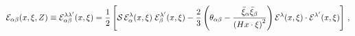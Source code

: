 \begin{equation}
{\cal E}_{\alpha\beta}(x,\xi,Z)\equiv {\cal
E}_{\alpha\beta}^{\lambda\lambda'}(x,\xi)=\frac{1}{2}
 \left[ {\cal S}\,{\cal
E}_{\alpha}^{\lambda}(x,\xi)\; {\cal
E}_{\beta}^{\lambda'}(x,\xi)-\frac{2}{3}
\left(\theta_{\alpha\beta}
-\frac{\bar{\xi}_{\alpha}\bar{\xi}_{\beta}}{\left(Hx\cdot\xi\right)^{2}}\right)
{\cal E}^{\lambda}(x,\xi)\cdot{\cal E}^{\lambda'}(x,\xi)\right]\,,
\end{equation}


